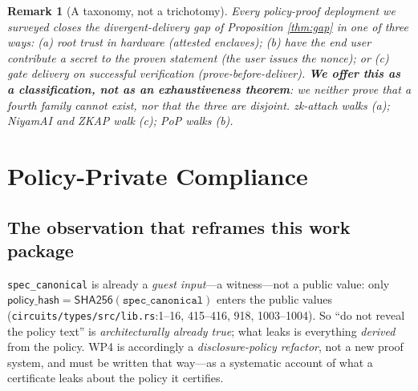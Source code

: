 \documentclass[journal]{IEEEtran}
\newtheorem{remark}[theorem]{Remark}
\newcommand{\need}[1]{}
\newcommand{\need}[1]{\textcolor{blue}{[[ NEED: #1 ]]}}
\begin{document}
\begin{remark}[A taxonomy, not a trichotomy]
\label{rem:taxonomy}
Every policy-proof deployment we surveyed closes the divergent-delivery gap of
Proposition \ref{thm:gap} in one of three ways:
(a) root trust in hardware (attested enclaves);
(b) have the \emph{end user} contribute a secret to the proven statement (the
user issues the nonce); or
(c) gate delivery on successful verification (\emph{prove-before-deliver}).
\textbf{We offer this as a classification, not as an exhaustiveness theorem}:
we neither prove that a fourth family cannot exist, nor that the three are
disjoint. zk-attach \cite{zkattach} walks (a); NiyamAI and ZKAP walk (c); PoP
walks (b).
\end{remark}

\need{\textbf{Posture, stated plainly.} Our system already carries
\texttt{response\_binding}, but $n$ is issued by the \emph{verifier}. Moving it
to the \emph{end user}---making $f > 0$ the receiver's contribution---closes
the divergent-delivery branch of Proposition \ref{thm:gap}. This is a small
protocol amendment, not a new system, and the paper must say exactly that. What
Theorem \ref{thm:t3} buys is the \emph{price}: with $f = 0$ there is no closure
at any cost.}

\section{Policy-Private Compliance}
\label{sec:private-policy}

\need{动机：对确定性规则 + 公开响应，签名哈希链就够了。唯一无法用签名
替代的场景是策略本身要保密。}

\subsection{The observation that reframes this work package}
\label{sec:wp4-finding}

\texttt{spec\_canonical} is already a \emph{guest input}---a witness---not a
public value: only
$\mathsf{policy\_hash} = \mathsf{SHA256}(\texttt{spec\_canonical})$
enters the public values (\texttt{circuits/types/src/lib.rs}:1--16, 415--416,
918, 1003--1004). So ``do not reveal the policy text'' is
\emph{architecturally already true}; what leaks is everything \emph{derived}
from the policy. WP4 is accordingly a \emph{disclosure-policy refactor}, not a
new proof system, and must be written that way---as a systematic account of
what a certificate leaks about the policy it certifies.
\end{document}
